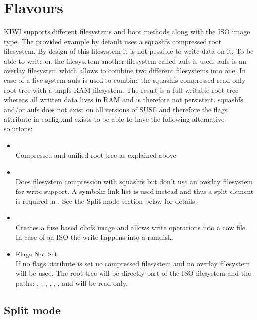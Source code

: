 \section{Flavours}

KIWI supports different filesystems and boot methods along with the
ISO image type. The provided example by default uses a squashfs compressed
root filesystem. By design of this filesystem it is not possible to write
data on it. To be able to write on the filesysetem another filesystem called
aufs is used. aufs is an overlay filesystem which allows to combine two
different filesystems into one. In case of a live system aufs is used
to combine the squashfs compressed read only root tree with a tmpfs
RAM filesystem. The result is a full writable root tree whereas all
written data lives in RAM and is therefore not persistent. squashfs and/or
aufs does not exist on all versions of SUSE and therefore the flags
attribute in config.xml exists to be able to have the following
alternative solutions:

\begin{itemize}
\item {}\\
      Compressed and unified root tree as explained above
\item {}\\
      Does filesystem compression with squashfs but don't use an
      overlay filesystem for write support. A symbolic link list is used
      instead and thus a split element is required in .
      See the Split mode section below for details.
\item {}\\
      Creates a fuse based clicfs image and allows write operations
      into a cow file. In case of an ISO the write happens into a
      ramdisk.
\item {Flags Not Set}\\
      If no flags attribute is set no compressed filesystem and no overlay
      filesystem will be used. The root tree will be directly part of
      the ISO filesystem and the paths: , , 
      , , ,
      , and  will be read-only.
\end{itemize}

\subsection{Split mode}

